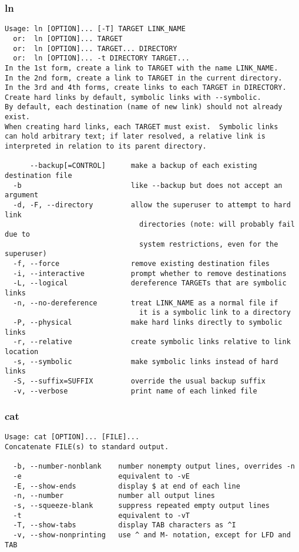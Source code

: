 \documentclass[11pt,a4paper]{article}
\newcommand{\cmd}[1]{
  \subsubsection*{#1}
  \addcontentsline{toc}{subsection}{#1}
}
\begin{document}
\cmd{ln}
\begin{verbatim}
Usage: ln [OPTION]... [-T] TARGET LINK_NAME
  or:  ln [OPTION]... TARGET
  or:  ln [OPTION]... TARGET... DIRECTORY
  or:  ln [OPTION]... -t DIRECTORY TARGET...
In the 1st form, create a link to TARGET with the name LINK_NAME.
In the 2nd form, create a link to TARGET in the current directory.
In the 3rd and 4th forms, create links to each TARGET in DIRECTORY.
Create hard links by default, symbolic links with --symbolic.
By default, each destination (name of new link) should not already exist.
When creating hard links, each TARGET must exist.  Symbolic links
can hold arbitrary text; if later resolved, a relative link is
interpreted in relation to its parent directory.

      --backup[=CONTROL]      make a backup of each existing destination file
  -b                          like --backup but does not accept an argument
  -d, -F, --directory         allow the superuser to attempt to hard link
                                directories (note: will probably fail due to
                                system restrictions, even for the superuser)
  -f, --force                 remove existing destination files
  -i, --interactive           prompt whether to remove destinations
  -L, --logical               dereference TARGETs that are symbolic links
  -n, --no-dereference        treat LINK_NAME as a normal file if
                                it is a symbolic link to a directory
  -P, --physical              make hard links directly to symbolic links
  -r, --relative              create symbolic links relative to link location
  -s, --symbolic              make symbolic links instead of hard links
  -S, --suffix=SUFFIX         override the usual backup suffix
  -v, --verbose               print name of each linked file
\end{verbatim}

\cmd{cat}
\begin{verbatim}
Usage: cat [OPTION]... [FILE]...
Concatenate FILE(s) to standard output.

  -b, --number-nonblank    number nonempty output lines, overrides -n
  -e                       equivalent to -vE
  -E, --show-ends          display $ at end of each line
  -n, --number             number all output lines
  -s, --squeeze-blank      suppress repeated empty output lines
  -t                       equivalent to -vT
  -T, --show-tabs          display TAB characters as ^I
  -v, --show-nonprinting   use ^ and M- notation, except for LFD and TAB
\end{verbatim}
\end{document}

